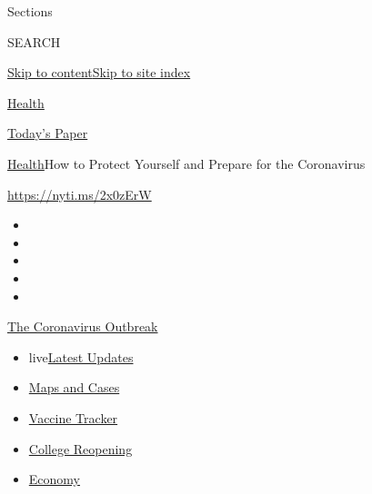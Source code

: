 Sections

SEARCH

\protect\hyperlink{site-content}{Skip to
content}\protect\hyperlink{site-index}{Skip to site index}

\href{https://www.nytimes3xbfgragh.onion/section/health}{Health}

\href{https://myaccount.nytimes3xbfgragh.onion/auth/login?response_type=cookie\&client_id=vi}{}

\href{https://www.nytimes3xbfgragh.onion/section/todayspaper}{Today's
Paper}

\href{/section/health}{Health}\textbar{}How to Protect Yourself and
Prepare for the Coronavirus

\href{https://nyti.ms/2x0zErW}{https://nyti.ms/2x0zErW}

\begin{itemize}
\item
\item
\item
\item
\item
\end{itemize}

\href{https://www.nytimes3xbfgragh.onion/news-event/coronavirus?action=click\&pgtype=Article\&state=default\&region=TOP_BANNER\&context=storylines_menu}{The
Coronavirus Outbreak}

\begin{itemize}
\tightlist
\item
  live\href{https://www.nytimes3xbfgragh.onion/2020/08/04/world/coronavirus-cases.html?action=click\&pgtype=Article\&state=default\&region=TOP_BANNER\&context=storylines_menu}{Latest
  Updates}
\item
  \href{https://www.nytimes3xbfgragh.onion/interactive/2020/us/coronavirus-us-cases.html?action=click\&pgtype=Article\&state=default\&region=TOP_BANNER\&context=storylines_menu}{Maps
  and Cases}
\item
  \href{https://www.nytimes3xbfgragh.onion/interactive/2020/science/coronavirus-vaccine-tracker.html?action=click\&pgtype=Article\&state=default\&region=TOP_BANNER\&context=storylines_menu}{Vaccine
  Tracker}
\item
  \href{https://www.nytimes3xbfgragh.onion/2020/08/02/us/covid-college-reopening.html?action=click\&pgtype=Article\&state=default\&region=TOP_BANNER\&context=storylines_menu}{College
  Reopening}
\item
  \href{https://www.nytimes3xbfgragh.onion/live/2020/08/04/business/stock-market-today-coronavirus?action=click\&pgtype=Article\&state=default\&region=TOP_BANNER\&context=storylines_menu}{Economy}
\end{itemize}

